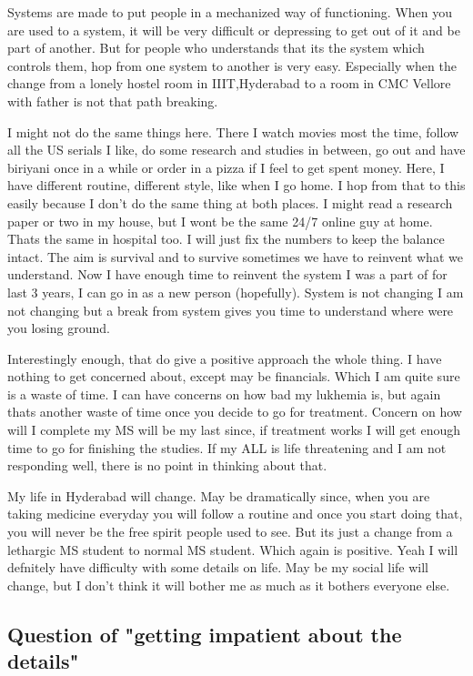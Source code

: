 Systems are made to put people in a mechanized way of functioning. When you are used to a system,
it will be very difficult or depressing to get out of it and be part of another. But for people
who understands that its the system which controls them, hop from one system to another is very
easy. Especially when the change from a lonely hostel room in IIIT,Hyderabad to a room in CMC 
Vellore with father is not that path breaking. 

I might not do the same things here. There I watch movies most the time, follow all the US serials
I like, do some research and studies in between, go out and have biriyani once in a while or order
in a pizza if I feel to get spent money. Here, I have different routine, different style, like 
when I go home. I hop from that to this easily because I don't do the same thing at both places.
I might read a research paper or two in my house, but I wont be the same 24/7 online guy at home.
Thats the same in hospital too. I will just fix the numbers to keep the balance intact. The aim 
is survival and to survive sometimes we have to reinvent what we understand. Now I have enough
time to reinvent the system I was a part of for last 3 years, I can go in as a new person 
(hopefully). System is not changing I am not changing but a break from system gives you time 
to understand where were you losing ground.

Interestingly enough, that do give a positive approach the whole thing. I have nothing to get 
concerned about, except may be financials. Which I am quite sure is a waste of time. I can have 
concerns on how bad my lukhemia is, but again thats another waste of time once you decide
to go for treatment. Concern on how will I complete my MS will be my last since, if treatment
works I will get enough time to go for finishing the studies. If my ALL is life threatening
and I am not responding well, there is no point in thinking about that.

My life in Hyderabad will change. May be dramatically since, when you are taking medicine 
everyday you will follow a routine and once you start doing that, you will never be the free
spirit people used to see. But its just a change from a lethargic MS student to normal 
MS student. Which again is positive. Yeah I will defnitely have difficulty with some details 
on life. May be my social life will change, but I don't think it will bother me as much 
as it bothers everyone else.

\subsection*{Question of "getting impatient about the details"} 

